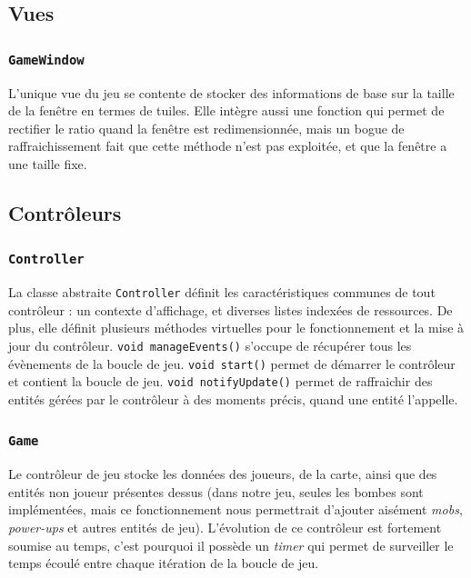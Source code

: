 \documentclass[a4paper,10pt]{report}
\begin{document}
\subsection{Vues}
\subsubsection{\texttt{GameWindow}}

L'unique vue du jeu se contente de stocker des informations de base sur la taille de la fenêtre en termes de tuiles. Elle intègre aussi une fonction qui permet de rectifier le ratio quand la fenêtre est redimensionnée, mais un bogue de raffraichissement fait que cette méthode n'est pas exploitée, et que la fenêtre a une taille fixe.

\subsection{Contrôleurs}
\subsubsection{\texttt{Controller}}

La classe abstraite \texttt{Controller} définit les caractéristiques communes de tout contrôleur : un contexte d'affichage, et diverses listes indexées de ressources. De plus, elle définit plusieurs méthodes virtuelles pour le fonctionnement et la mise à jour du contrôleur. \texttt{void manageEvents()} s'occupe de récupérer tous les évènements de la boucle de jeu. \texttt{void start()} permet de démarrer le contrôleur et contient la boucle de jeu. \texttt{void notifyUpdate()} permet de raffraichir des entités gérées par le contrôleur à des moments précis, quand une entité l'appelle.
\subsubsection{\texttt{Game}}

Le contrôleur de jeu stocke les données des joueurs, de la carte, ainsi que des entités non joueur présentes dessus (dans notre jeu, seules les bombes sont implémentées, mais ce fonctionnement nous permettrait d'ajouter aisément \textit{mobs}, \textit{power-ups} et autres entités de jeu). L'évolution de ce contrôleur est fortement soumise au temps, c'est pourquoi il possède un \textit{timer} qui permet de surveiller le temps écoulé entre chaque itération de la boucle de jeu.
\end{document}
